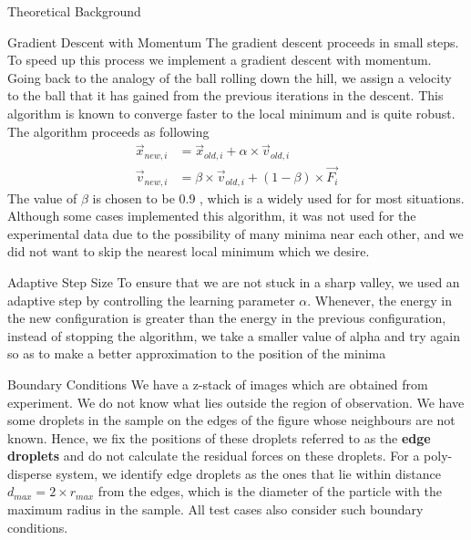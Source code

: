 \documentclass[12pt]{article}
\begin{document}
\begin{section}{Theoretical Background}
\begin{subsection}{Gradient Descent with Momentum}
The gradient descent proceeds in small steps. To speed up this process we implement a gradient descent with momentum. Going back to the analogy of the ball rolling down the hill, we assign a velocity to the ball that it has gained from the previous iterations in the descent. This algorithm is known to converge faster to the local minimum and is quite robust. 
The algorithm proceeds as following
\begin{align}
    \Vec{x}_{new,i} &= \Vec{x}_{old,i} + \alpha \times \Vec{v}_{old,i} \\
    \Vec{v}_{new,i} &= \beta \times \Vec{v}_{old,i} + (1-\beta) \times \Vec{F_i}
\end{align}
The value of $\beta$ is chosen to be 0.9 \cite{qian1999momentum}, which is a widely used for for most situations. 
Although some cases implemented this algorithm, it was not used for the experimental data due to the possibility of many minima near each other, and we did not want to skip the nearest local minimum which we desire.
\end{subsection}

\begin{subsection}{Adaptive Step Size}
To ensure that we are not stuck in a sharp valley, we used an adaptive step by controlling the learning parameter $\alpha$. Whenever, the energy in the new configuration is greater than the energy in the previous configuration, instead of stopping the algorithm, we take a smaller value of alpha and try again so as to make a better approximation to the position of the minima
\end{subsection}

\begin{subsection}{Boundary Conditions}
We have a z-stack of images which are obtained from experiment. We do not know what lies outside the region of observation. We have some droplets in the sample on the edges of the figure whose neighbours are not known. Hence, we fix the positions of these droplets referred to as the \textbf{edge droplets} and do not calculate the residual forces on these droplets. For a poly-disperse system, we identify edge droplets as the ones that lie within distance $d_{max} = 2 \times r_{max}$ from the edges, which is the diameter of the particle with the maximum radius in the sample. All test cases also consider such boundary conditions.
\end{subsection}


\end{section}
\end{document}
